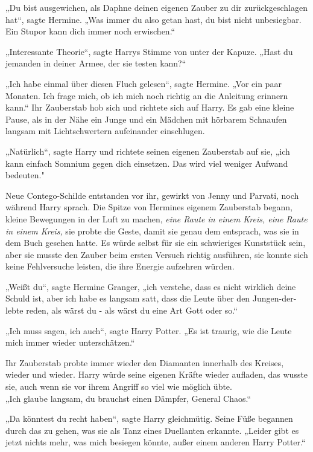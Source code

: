 {„Du bist ausgewichen, als Daphne deinen eigenen Zauber zu dir zurückgeschlagen hat“, sagte Hermine. „Was immer du also getan hast, du bist nicht unbesiegbar. Ein Stupor kann dich immer noch erwischen.“

„Interessante Theorie“, sagte Harrys Stimme von unter der Kapuze. „Hast du jemanden in deiner Armee, der sie testen kann?“

„Ich habe einmal über diesen Fluch gelesen“, sagte Hermine. „Vor ein paar Monaten. Ich frage mich, ob ich mich noch richtig an die Anleitung erinnern kann.“ Ihr Zauberstab hob sich und richtete sich auf Harry. Es gab eine kleine Pause, als in der Nähe ein Junge und ein Mädchen mit hörbarem Schnaufen langsam mit Lichtschwertern aufeinander einschlugen.

„Natürlich“, sagte Harry und richtete seinen eigenen Zauberstab auf sie, „ich kann einfach Somnium gegen dich einsetzen. Das wird viel weniger Aufwand bedeuten."

Neue Contego-Schilde entstanden vor ihr, gewirkt von Jenny und Parvati, noch während Harry sprach. Die Spitze von Hermines eigenem Zauberstab begann, kleine Bewegungen in der Luft zu machen, \emph{eine Raute in einem Kreis, eine Raute in einem Kreis,} sie probte die Geste, damit sie genau dem entsprach, was sie in dem Buch gesehen hatte. Es würde selbst für sie ein schwieriges Kunststück sein, aber sie musste den Zauber beim ersten Versuch richtig ausführen, sie konnte sich keine Fehlversuche leisten, die ihre Energie aufzehren würden.

„Weißt du“, sagte Hermine Granger, „ich verstehe, dass es nicht wirklich deine Schuld ist, aber ich habe es langsam satt, dass die Leute über den Jungen-der-lebte reden, als wärst du - als wärst du eine Art Gott oder so.“

„Ich muss sagen, ich auch“, sagte Harry Potter. „Es ist traurig, wie die Leute mich immer wieder unterschätzen.“

Ihr Zauberstab probte immer wieder den Diamanten innerhalb des Kreises, wieder und wieder. Harry würde seine eigenen Kräfte wieder aufladen, das wusste sie, auch wenn sie vor ihrem Angriff so viel wie möglich übte.\\ „Ich glaube langsam, du brauchst einen Dämpfer, General Chaos.“

„Da könntest du recht haben“, sagte Harry gleichmütig. Seine Füße begannen durch das zu gehen, was sie als Tanz eines Duellanten erkannte. „Leider gibt es jetzt nichts mehr, was mich besiegen könnte, außer einem anderen Harry Potter.“

}
